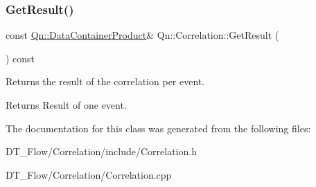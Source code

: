 \subsubsection{\texorpdfstring{Get\+Result()}{GetResult()}}
{\footnotesize\ttfamily const \mbox{\hyperlink{classQn_1_1DataContainer}{Qn\+::\+Data\+Container\+Product}}\& Qn\+::\+Correlation\+::\+Get\+Result (\begin{DoxyParamCaption}{ }\end{DoxyParamCaption}) const\hspace{0.3cm}{\ttfamily [inline]}}

Returns the result of the correlation per event. \begin{DoxyReturn}{Returns}
Result of one event. 
\end{DoxyReturn}


The documentation for this class was generated from the following files\+:\begin{DoxyCompactItemize}
\item 
D\+T\+\_\+\+Flow/\+Correlation/include/Correlation.\+h\item 
D\+T\+\_\+\+Flow/\+Correlation/Correlation.\+cpp\end{DoxyCompactItemize}
